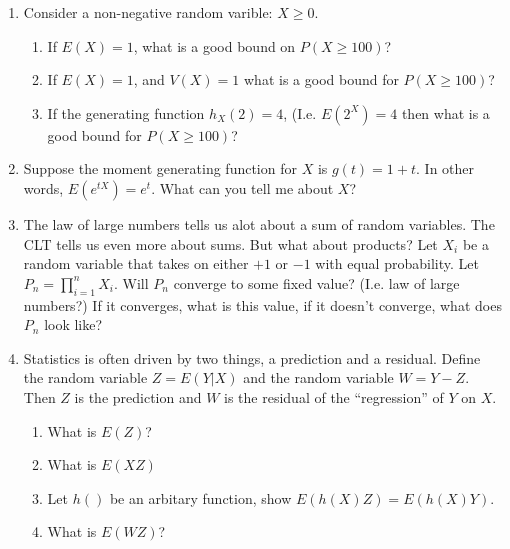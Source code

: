 \documentclass[letter,12pt]{extarticle}
\newcommand{\gap}{\vspace{1em}}
\newcommand{\answer}[1]{\noindent{\textcolor{mypurple}{\scriptsize{\{\bf answer:} \em #1\}}}}
\renewcommand{\answer}[1]{}
\begin{document}
\begin{enumerate}
\item Consider a non-negative random varible: $X \ge 0$.  
\begin{enumerate}
\item If $E(X) = 1$, what is a good bound on $P(X \ge 100)$?
\item If $E(X) = 1$, and $V(X) = 1$ what is a good bound for $P(X \ge 100)$?
\item If the generating function $h_X(2) = 4$, (I.e. $E(2^X) = 4$ then what is a
good bound for $P(X \ge 100)$?
\end{enumerate}
\gap


\item Suppose the moment generating function for $X$ is $g(t) = 1 +
 t$.  In other words, $E(e^{tX}) = e^t$.  What can you tell me about
 $X$? \answer{$E(X) = 1$, $E(X^2) = 1$, so $var(X) = 0$ so $P(X=1)=1$.}


\item The law of large numbers tells us alot about a sum of random
 variables.  The CLT tells us even more about sums.  But what about
 products?  Let $X_i$ be a random variable that takes on either $+1$
or $-1$ with equal probability.  Let $P_n = \prod_{i=1}^n X_i$.  Will
$P_n$ converge to some fixed value?  (I.e. law of large numbers?)  If
it converges, what is this value, if it doesn't converge, what does
$P_n$ look like?\answer{Does not converge.  $P(P_n = 1) = P(P_n = -1)
= .5$.}

\gap
\item Statistics is often driven by two things, a prediction and a
residual.  Define the random variable $Z = E(Y|X)$ and the random
variable $W = Y - Z$.  Then $Z$ is the prediction and $W$ is the
residual of the ``regression'' of $Y$ on $X$.  
\begin{enumerate}
\item What is $E(Z)$?\answer{$E(Z) = E(E(Y|X)) = E(Y)$}
\item What is $E(XZ)$\answer{$E(XZ) = E(XE(Y|X)) = E(E(XY|X)) = E(XY)$}
\item Let $h()$ be an arbitary function, show $E(h(X)Z) = E(h(X)Y)$. \answer{$E(g(X)Z) = E(g(X)E(Y|X)) = E(E(g(X)Y|X)) = E(g(X)Y)$}
\item What is $E(WZ)$?\answer{$E(WZ) = E(E(WZ|X)) = E(ZE(W|X)) =
E(ZE(Y - Z|X)) = E(ZE(Y|X) - ZE(Z|X)) = E(Z^2 - Z^2) = 0$}
\end{enumerate}
\gap


\end{enumerate}
\end{document}
